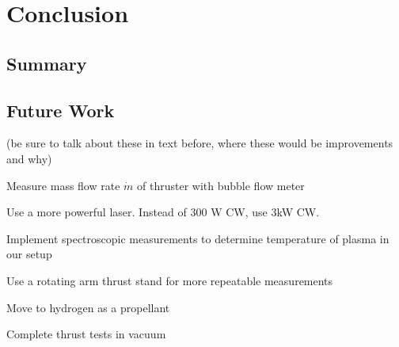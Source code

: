 \chapter{Conclusion}

    \section{Summary}


    \section{Future Work}
        (be sure to talk about these in text before, where these would be improvements and why)

        Measure mass flow rate $\dot m$ of thruster with bubble flow meter
        
        Use a more powerful laser. Instead of 300 W CW, use 3kW CW.
        
        Implement spectroscopic measurements to determine temperature of plasma in our setup
        
        Use a rotating arm thrust stand for more repeatable measurements
        
        Move to hydrogen as a propellant
        
        Complete thrust tests in vacuum
